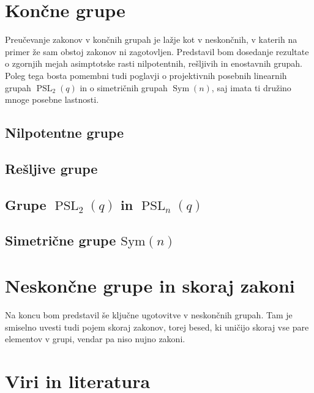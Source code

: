\documentclass[12pt,a4paper]{article}
\begin{document}
\section{Končne grupe}
Preučevanje zakonov v končnih grupah je lažje kot v neskončnih, v katerih na primer že sam obstoj zakonov ni zagotovljen. Predstavil bom dosedanje rezultate o zgornjih mejah asimptotske rasti nilpotentnih, rešljivih in enostavnih grupah. Poleg tega bosta pomembni tudi poglavji o
projektivnih posebnih linearnih grupah $\operatorname{PSL}_2(q)$ in o simetričnih grupah $\operatorname{Sym}(n)$, saj imata ti družino mnoge posebne lastnosti.

\subsection{Nilpotentne grupe}
\subsection{Rešljive grupe}
\subsection{Grupe $\operatorname{PSL}_2(q)$ in $\operatorname{PSL}_n(q)$}
\subsection{Simetrične grupe $\text{Sym}(n)$}

\section{Neskončne grupe in skoraj zakoni}
Na koncu bom predstavil še ključne ugotovitve v neskončnih grupah. Tam je smiselno uvesti tudi pojem skoraj zakonov, torej besed, ki uničijo skoraj vse pare elementov v grupi, vendar pa niso nujno zakoni. 

\section{Viri in literatura}
\end{document}
